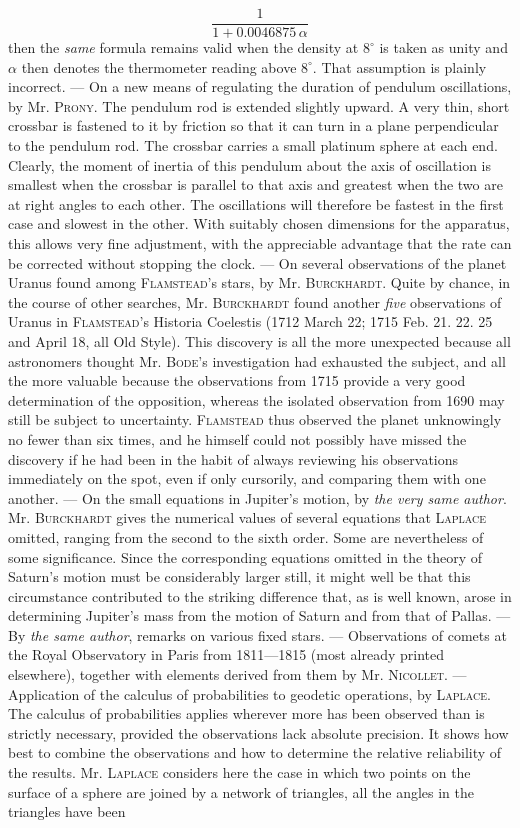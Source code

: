 \[
\frac{1}{1+0.0046875\,\alpha}
\]
 then the \emph{same} formula remains valid when the density at $8^\circ$ is taken as unity and $\alpha$ then denotes the thermometer reading above $8^\circ$. That assumption is plainly incorrect. --- On a new means of regulating the duration of pendulum oscillations, by Mr. \textsc{Prony}. The pendulum rod is extended slightly upward. A very thin, short crossbar is fastened to it by friction so that it can turn in a plane perpendicular to the pendulum rod. The crossbar carries a small platinum sphere at each end. Clearly, the moment of inertia of this pendulum about the axis of oscillation is smallest when the crossbar is parallel to that axis and greatest when the two are at right angles to each other. The oscillations will therefore be fastest in the first case and slowest in the other. With suitably chosen dimensions for the apparatus, this allows very fine adjustment, with the appreciable advantage that the rate can be corrected without stopping the clock. --- On several observations of the planet Uranus found among \textsc{Flamstead}'s stars, by Mr. \textsc{Burckhardt}. Quite by chance, in the course of other searches, Mr. \textsc{Burckhardt} found another \emph{five} observations of Uranus in \textsc{Flamstead}'s Historia Coelestis (1712 March 22; 1715 Feb. 21. 22. 25 and April 18, all Old Style). This discovery is all the more unexpected because all astronomers thought Mr. \textsc{Bode}'s investigation had exhausted the subject, and all the more valuable because the observations from 1715 provide a very good determination of the opposition, whereas the isolated observation from 1690 may still be subject to uncertainty. \textsc{Flamstead} thus observed the planet unknowingly no fewer than six times, and he himself could not possibly have missed the discovery if he had been in the habit of always reviewing his observations immediately on the spot, even if only cursorily, and comparing them with one another. --- On the small equations in Jupiter's motion, by \emph{the very same author}. Mr. \textsc{Burckhardt} gives the numerical values of several equations that \textsc{Laplace} omitted, ranging from the second to the sixth order. Some are nevertheless of some significance. Since the corresponding equations omitted in the theory of Saturn's motion must be considerably larger still, it might well be that this circumstance contributed to the striking difference that, as is well known, arose in determining Jupiter's mass from the motion of Saturn and from that of Pallas. --- By \emph{the same author}, remarks on various fixed stars. --- Observations of comets at the Royal Observatory in Paris from 1811---1815 (most already printed elsewhere), together with elements derived from them by Mr. \textsc{Nicollet}. --- Application of the calculus of probabilities to geodetic operations, by \textsc{Laplace}. The calculus of probabilities applies wherever more has been observed than is strictly necessary, provided the observations lack absolute precision. It shows how best to combine the observations and how to determine the relative reliability of the results. Mr. \textsc{Laplace} considers here the case in which two points on the surface of a sphere are joined by a network of triangles, all the angles in the triangles have been 